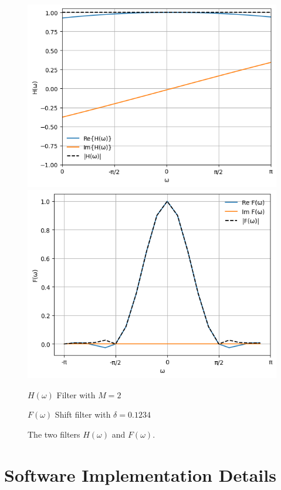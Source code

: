 \documentclass[]{usiinfbachelorproject}
\begin{document}
		
		\begin{figure}
			\centering
			\includegraphics[height=0.25\columnwidth]{images/h_filter.png}\hspace*{0.1\columnwidth}
			\includegraphics[height=0.25\columnwidth]{images/filter_m_2.png}\\
			\parbox{0.4\columnwidth}{\centering $H(\omega)$ Filter with $M=2$}\hspace*{0.1\columnwidth}
			\parbox{0.4\columnwidth}{\centering $F(\omega)$ Shift filter with $\delta=0.1234$}
			\caption{The two filters $H(\omega)$ and $F(\omega)$.}
			\label{fig:h_f_filters}
		\end{figure}
		
		
		
		\section{Software Implementation Details}
		
		
		
\end{document}
